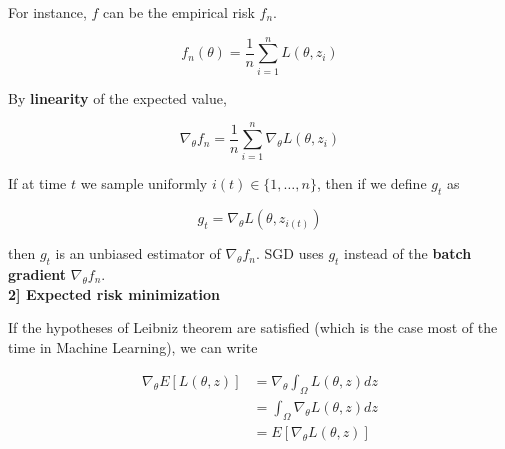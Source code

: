 \documentclass[
10pt, %
a4paper, %
oneside, %
headinclude,footinclude, %
BCOR5mm, %
]{scrartcl}
\begin{document}
For instance, $f$ can be the empirical risk $f_n$.

\begin{equation*}
    f_n(\theta) =  \frac{1}{n} \sum^{n}_{i=1} L(\theta, z_i)
\end{equation*}

By \textbf{{linearity}} of the expected value,

\begin{equation}
    \label{eq:sgdest}
    \nabla_{\theta}f_n = \frac{1}{n} \sum^{n}_{i=1} \nabla_{\theta}L(\theta, z_i)
\end{equation}

If at time $t$ we sample uniformly $i(t)\in \{1, \dots, n\}$, then if we define $g_t$ as

\begin{equation*}
    g_t = \nabla_{\theta}L(\theta, z_{i(t)})
\end{equation*}

then $g_t$ is an unbiased estimator of $\nabla_{\theta}f_n$. SGD uses $g_t$ instead of the \textbf{{batch gradient}} $\nabla_{\theta}f_n$.
\\

\textbf{{2] Expected risk minimization}} 

% 
% 
% 
% 
If the hypotheses of Leibniz theorem are satisfied (which is the case most of the time in Machine Learning), we can write

\begin{equation*}
    \begin{aligned}
	\nabla_{\theta}E[L(\theta, z)]&= \nabla_{\theta} \int_{\Omega} L(\theta, z) dz\\
	&= \int_{\Omega} \nabla_{\theta}L(\theta, z) dz\\
	&= E[\nabla_{\theta}L(\theta, z)]
    \end{aligned}
\end{equation*}
\end{document}
